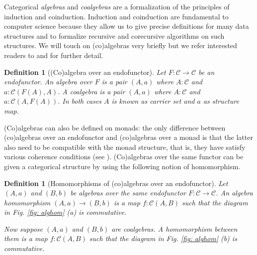 \documentclass[11pt,a4paper,openright,twoside]{report}
\newcounter{mycounter}
\theoremstyle{plain}
\newtheorem{definition}[mycounter]{Definition}
\theoremstyle{definition}
\begin{document}
Categorical \textit{algebras} and \textit{coalgebras} are a formalization of the principles of induction and coinduction. Induction and coinduction are fundamental to computer science because they allow us to give precise definitions for many data structures and to formalize recursive and corecursive algorithms on such structures. We will touch on (co)algebras very briefly but we refer interested readers to \cite{jacobs1997tutorial} and \cite{wisbauer2008algebras} for further detail.

\begin{definition}[(Co)algebra over an endofunctor]
  \label{def: endalg}
  Let $F: \mathcal{C} \to \mathcal{C}$ be an endofunctor. An algebra over $F$ is a pair $(A,a)$ where $A: \mathcal{C}$ and $a:\mathcal{C}(F(A),A)$. A coalgebra is a pair $(A,a)$ where $A: \mathcal{C}$ and $a:\mathcal{C}(A,F(A))$. In both cases $A$ is known as carrier set and $a$ as structure map.
\end{definition}

(Co)algebras can also be defined on monads: the only difference between (co)algebras over an endofunctor and (co)algebras over a monad is that the latter also need to be compatible with the monad structure, that is, they have satisfy various coherence conditions (see \cite{gavranovicposition}). (Co)algebras over the same functor can be given a categorical structure by using the following notion of homomorphism.

\begin{definition}[Homomorphisms of (co)algebras over an endofunctor]
  Let $(A,a)$ and $(B,b)$ be algebras over the same endofunctor $F: \mathcal{C} \to \mathcal{C}$. An algebra homomorphism $(A,a)\to (B,b)$ is a map $f: \mathcal{C}(A,B)$ such that the diagram in \textit{Fig. \ref{fig: alghom} (a)} is commutative.

  Now suppose $(A,a)$ and $(B,b)$ are coalgebras. A homomorphism between them is a map $f: \mathcal{C}(A,B)$ such that the diagram in \textit{Fig. \ref{fig: alghom} (b)} is commutative.
\end{definition}
\end{document}
